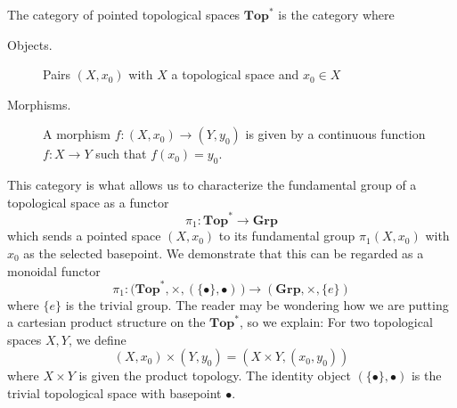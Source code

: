 \begin{example}
    The category of pointed topological spaces $\textbf{Top}^*$ is the category 
    where 
    \begin{description}
        \item[Objects.] Pairs $(X, x_0)$ with $X$ a topological space and $x_0 \in X$ 
        \item[Morphisms.] A morphism $f:(X, x_0) \to (Y, y_0)$ is given by a continuous function 
        $f: X \to Y$ such that $f(x_0) = y_0$.  
    \end{description}
    This category is what allows us to characterize the fundamental group of a topological 
    space as a functor 
    \[
        \pi_1: \textbf{Top}^* \to \textbf{Grp}  
    \]
    which sends a pointed space $(X, x_0)$ to its fundamental group $\pi_1(X, x_0)$ with $x_0$ as the selected 
    basepoint. We demonstrate that this can be regarded as a monoidal functor 
    \[
        \pi_1: \Big(\textbf{Top}^*, \times, (\{\bullet\}, \bullet)\,\Big) \to (\textbf{Grp}, \times, \{e\})
    \]
    where $\{e\}$ is the trivial group. The reader may be wondering how we are putting 
    a cartesian product structure on the $\textbf{Top}^*$, so we explain: 
    For two topological spaces $X, Y$, we define 
    \[
        (X, x_0) \times (Y, y_0) = (X \times Y, (x_0, y_0))
    \]
    where $X \times Y$ is given the product topology. The identity object $(\{\bullet\}, \bullet)$ 
    is the trivial topological space with basepoint $\bullet$.  
    

\end{example}
